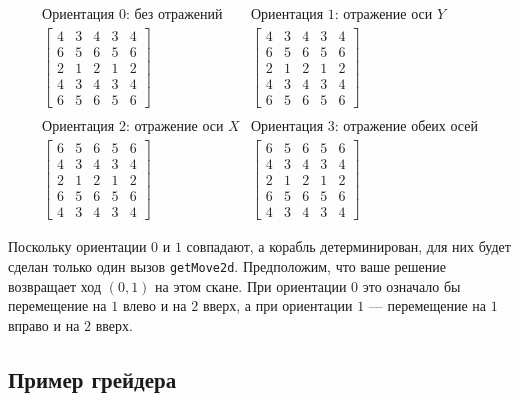 \documentclass[12pt]{article}
\begin{document}
\[
\begin{array}{cc}
\text{Ориентация $0$: без отражений} & \text{Ориентация $1$: отражение оси $Y$} \\
\left[
\begin{array}{ccccc}
4 & 3 & 4 & 3 & 4 \\
6 & 5 & 6 & 5 & 6 \\
2 & 1 & 2 & 1 & 2 \\
4 & 3 & 4 & 3 & 4 \\
6 & 5 & 6 & 5 & 6
\end{array}
\right]
&
\left[
\begin{array}{ccccc}
4 & 3 & 4 & 3 & 4 \\
6 & 5 & 6 & 5 & 6 \\
2 & 1 & 2 & 1 & 2 \\
4 & 3 & 4 & 3 & 4 \\
6 & 5 & 6 & 5 & 6
\end{array}
\right]
\\
\\
\text{Ориентация $2$: отражение оси $X$} & \text{Ориентация $3$: отражение обеих осей} \\
\left[
\begin{array}{ccccc}
6 & 5 & 6 & 5 & 6 \\
4 & 3 & 4 & 3 & 4 \\
2 & 1 & 2 & 1 & 2 \\
6 & 5 & 6 & 5 & 6 \\
4 & 3 & 4 & 3 & 4
\end{array}
\right]
&
\left[
\begin{array}{ccccc}
6 & 5 & 6 & 5 & 6 \\
4 & 3 & 4 & 3 & 4 \\
2 & 1 & 2 & 1 & 2 \\
6 & 5 & 6 & 5 & 6 \\
4 & 3 & 4 & 3 & 4
\end{array}
\right]
\end{array}
\]

Поскольку ориентации $0$ и $1$ совпадают, а корабль детерминирован, для них будет сделан только один вызов \verb|getMove2d|. Предположим, что ваше решение возвращает ход $(0, 1)$ на этом скане. При ориентации $0$ это означало бы перемещение на $1$ влево и на $2$ вверх, а при ориентации $1$ --- перемещение на $1$ вправо и на $2$ вверх.

\subsection{Пример грейдера}
\end{document}
